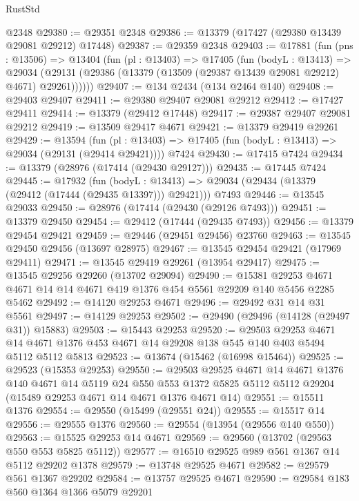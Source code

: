 \begin{lexlean}{RustStd}
\begin{coremodule}
    @2348
@29380 := @29351 @2348
@29386 := @13379 (@17427 (@29380 @13439 @29081 @29212) @17448)
@29387 := @29359 @2348
@29403 := @17881
    (fun (pns : @13506) =>
    @13404
      (fun (pl : @13403) =>
      @17405
        (fun (bodyL : @13413) =>
        @29034 (@29131 (@29386 (@13379 (@13509 (@29387 @13439 @29081 @29212) @4671) @29261))))))
@29407 := @134 @2434 (@134 @2464 @140)
@29408 := @29403 @29407
@29411 := @29380 @29407 @29081 @29212
@29412 := @17427 @29411
@29414 := @13379 (@29412 @17448)
@29417 := @29387 @29407 @29081 @29212
@29419 := @13509 @29417 @4671
@29421 := @13379 @29419 @29261
@29429 := @13594
    (fun (pl : @13403) => @17405 (fun (bodyL : @13413) => @29034 (@29131 (@29414 @29421))))
    @7424
@29430 := @17415 @7424
@29434 := @13379 (@28976 (@17414 (@29430 @29127)))
@29435 := @17445 @7424
@29445 := @17932
    (fun (bodyL : @13413) => @29034 (@29434 (@13379 (@29412 (@17444 (@29435 @13397))) @29421)))
    @7493
@29446 := @13545 @29033
@29450 := @28976 (@17414 (@29430 (@29126 @7493)))
@29451 := @13379 @29450
@29454 := @29412 (@17444 (@29435 @7493))
@29456 := @13379 @29454 @29421
@29459 := @29446 (@29451 @29456) @23760
@29463 := @13545 @29450 @29456 (@13697 @28975)
@29467 := @13545 @29454 @29421 (@17969 @29411)
@29471 := @13545 @29419 @29261 (@13954 @29417)
@29475 := @13545 @29256 @29260 (@13702 @29094)
@29490 := @15381
    @29253
    @4671
    @4671
    @14
    @14
    @4671
    @419
    @1376
    @454
    @5561
    @29209
    @140
    @5456
    @2285
    @5462
@29492 := @14120 @29253 @4671
@29496 := @29492 @31 @14 @31 @5561
@29497 := @14129 @29253
@29502 := @29490 (@29496 (@14128 (@29497 @31)) @15883)
@29503 := @15443 @29253
@29520 := @29503
    @29253
    @4671
    @14
    @4671
    @1376
    @453
    @4671
    @14
    @29208
    @138
    @545
    @140
    @403
    @5494
    @5112
    @5112
    @5813
@29523 := @13674 (@15462 (@16998 @15464))
@29525 := @29523 (@15353 @29253)
@29550 := @29503
    @29525
    @4671
    @14
    @4671
    @1376
    @140
    @4671
    @14
    @5119
    @24
    @550
    @553
    @1372
    @5825
    @5112
    @5112
    @29204
    (@15489 @29253 @4671 @14 @4671 @1376 @4671 @14)
@29551 := @15511 @1376
@29554 := @29550 (@15499 (@29551 @24))
@29555 := @15517 @14
@29556 := @29555 @1376
@29560 := @29554 (@13954 (@29556 @140 @550))
@29563 := @15525 @29253 @14 @4671
@29569 := @29560 (@13702 (@29563 @550 @553 @5825 @5112))
@29577 := @16510 @29525 @989 @561 @1367 @14 @5112 @29202 @1378
@29579 := @13748 @29525 @4671
@29582 := @29579 @561 @1367 @29202
@29584 := @13757 @29525 @4671
@29590 := @29584 @183 @560 @1364 @1366 @5079 @29201

\end{coremodule}
\end{lexlean}
